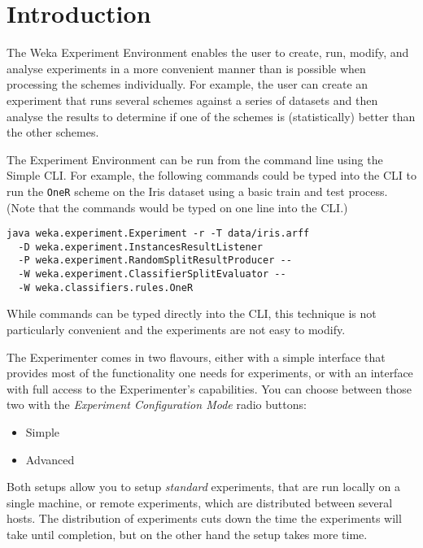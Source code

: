 

\section{Introduction}

The Weka Experiment Environment enables the user to create, run, modify, and analyse experiments in a more convenient manner than is possible when processing the schemes individually. For example, the user can create an experiment that runs several schemes against a series of datasets and then analyse the results to determine if one of the schemes is (statistically) better than the other schemes.

The Experiment Environment can be run from the command line using the Simple CLI. For example, the following commands could be typed into the CLI to run the \texttt{OneR} scheme on the Iris dataset using a basic train and test process. (Note that the commands would be typed on one line into the CLI.)

\begin{verbatim}
java weka.experiment.Experiment -r -T data/iris.arff
  -D weka.experiment.InstancesResultListener
  -P weka.experiment.RandomSplitResultProducer --
  -W weka.experiment.ClassifierSplitEvaluator --
  -W weka.classifiers.rules.OneR
\end{verbatim}

While commands can be typed directly into the CLI, this technique is not particularly convenient and the experiments are not easy to modify.

The Experimenter comes in two flavours, either with a simple interface that provides most of the functionality one needs for experiments, or with an interface with full access to the Experimenter's capabilities. You can choose between those two with the \textit{Experiment Configuration Mode} radio buttons:

\begin{itemize}
	\item Simple
	\item Advanced 
\end{itemize}

Both setups allow you to setup \textit{standard} experiments, that are run locally on a single machine, or remote experiments, which are distributed between several hosts. The distribution of experiments cuts down the time the experiments will take until completion, but on the other hand the setup takes more time.

